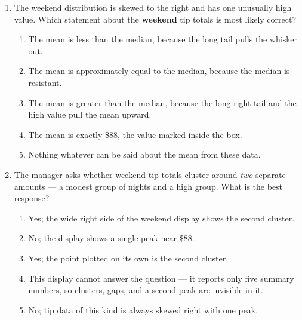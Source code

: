 \documentclass[12pt]{article}
\begin{document}
\begin{enumerate}[leftmargin=1.9em, itemsep=0.13in]
  \item The weekend distribution is skewed to the right and has one unusually high value. Which
        statement about the \textbf{weekend} tip totals is most likely correct?
        \begin{enumerate}[label=\textbf{(\Alph*)}, leftmargin=2.2em, itemsep=2pt]
          \item The mean is less than the median, because the long tail pulls the whisker out.
          \item The mean is approximately equal to the median, because the median is resistant.
          \item The mean is greater than the median, because the long right tail and the high
                value pull the mean upward.
          \item The mean is exactly \$88, the value marked inside the box.
          \item Nothing whatever can be said about the mean from these data.
                \hfill{}
        \end{enumerate}

  \item The manager asks whether weekend tip totals cluster around \emph{two} separate amounts
        --- a modest group of nights and a high group. What is the best response?
        \begin{enumerate}[label=\textbf{(\Alph*)}, leftmargin=2.2em, itemsep=2pt]
          \item Yes; the wide right side of the weekend display shows the second cluster.
          \item No; the display shows a single peak near \$88.
          \item Yes; the point plotted on its own is the second cluster.
          \item This display cannot answer the question --- it reports only five summary
                numbers, so clusters, gaps, and a second peak are invisible in it.
          \item No; tip data of this kind is always skewed right with one peak.
                \hfill{}
        \end{enumerate}

\end{enumerate}

\vspace{0.14in}
\end{document}
